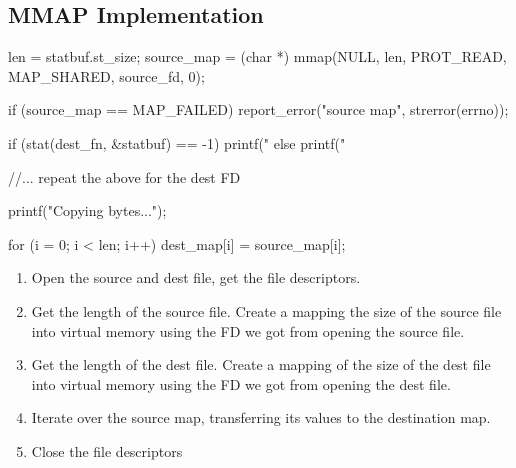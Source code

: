 \subsection{MMAP Implementation}
\begin{csrc}
        len = statbuf.st_size;
        source_map = (char *) mmap(NULL, len,
                                   PROT_READ, MAP_SHARED, source_fd, 0);

        if (source_map == MAP_FAILED) {
                report_error("source map", strerror(errno));
        }

        if (stat(dest_fn, &statbuf) == -1) {
                printf("%
        } else {
                printf("%
        }

        //... repeat the above for the dest FD

        printf("Copying bytes...\n");

        for (i = 0; i < len; i++) {
                dest_map[i] = source_map[i];
        }
\end{csrc}
\begin{enumerate}
\item Open the source and dest file, get the file descriptors.
\item Get the length of the source file. Create a mapping the size of the source
  file into virtual memory using the FD we got from opening the source file.
\item Get the length of the dest file. Create a mapping of the size of the dest
  file into virtual memory using the FD we got from opening the dest file.
\item Iterate over the source map, transferring its values to the destination
  map.
\item Close the file descriptors
\end{enumerate}

